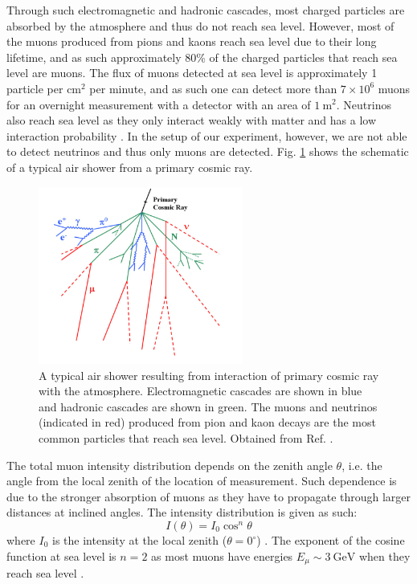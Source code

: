 \documentclass[a4paper]{report}
\numberwithin{equation}{section}
\begin{document}
Through such electromagnetic and hadronic cascades, most charged particles are absorbed by the atmosphere and thus do not reach sea level. However, most of the muons 
produced from pions and kaons reach sea level due to their long lifetime, and as such approximately 80\% of the charged particles that reach sea level are muons.
The flux of muons detected at sea level is approximately 1 particle per cm$^2$ per minute, and as such one can detect more than $7 \times 10^{6}$ muons for an 
overnight measurement with a detector with an area of $\SI{1}{\meter\squared}$.  Neutrinos also reach sea level as they only interact weakly with matter and has a 
low interaction probability \cite{Grupen2005}. In the setup of our experiment, however, we are not able to detect neutrinos and thus only muons are detected. 
Fig. \ref{fig:air_shower} shows the schematic of a typical air shower from a primary cosmic ray. \par 


\begin{figure}[!h]
	\centering
	\includegraphics[width=0.6\textwidth]{air_shower.png}
	\caption{A typical air shower resulting from interaction of primary cosmic ray with the atmosphere. Electromagnetic cascades are shown in blue and hadronic 
	cascades are shown in green. The muons and neutrinos (indicated in red) produced from pion and kaon decays are the most common particles that reach sea level.
	Obtained from Ref. \cite{Blanco2009}.}
	\label{fig:air_shower}	
\end{figure}

The total muon intensity distribution depends on the zenith angle $\theta$, i.e. the angle from the local zenith of the location of 
measurement. Such dependence is due to the stronger absorption of muons as they have to propagate through larger distances at 
inclined angles. The intensity distribution is given as such: 
\begin{equation}
    I(\theta) = I_0 \cos^n \theta 
\end{equation}
where $I_0$ is the intensity at the local zenith ($\theta = 0^\circ$) \cite{Grupen2005}. The exponent of the cosine function at 
sea level is $n = 2$ as most muons have energies $E_\mu \sim \SI{3}{\giga\electronvolt}$ when they reach sea level \cite{Stefano2012}.
\end{document}
